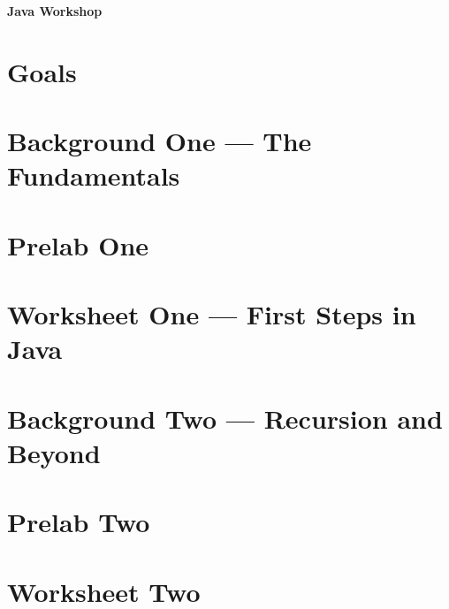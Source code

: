 \documentclass{article}
\renewcommand{\maketitle}{
   \begin{center}
      {\Huge \bfseries Java Workshop}
   \end{center}
}
\begin{document}
\maketitle

\section{Goals}

\pagebreak

\section{Background One --- The Fundamentals}

\pagebreak

\section{Prelab One}

\pagebreak

\section{Worksheet One --- First Steps in Java}

\pagebreak

\section{Background Two --- Recursion and Beyond}

\pagebreak

\section{Prelab Two}

\pagebreak

\section{Worksheet Two}

\pagebreak
\end{document}
